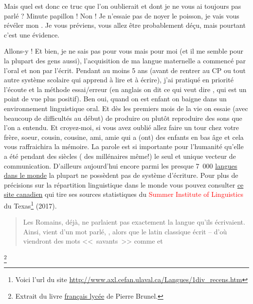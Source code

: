 Mais quel est donc ce truc  que l'on oublierait et dont je
ne vous ai toujours pas parlé ? Minute papillon ! Non ! Je n'essaie
pas de noyer le poisson, je vais vous révéler mon . Je vous
préviens, vous allez être probablement déçu, mais pourtant c'est une
évidence. \par
Allons-y ! Et bien, je ne sais pas pour vous mais pour moi (et il me
semble pour la plupart des gens aussi), l'acquisition de ma langue
maternelle a commencé par l'oral et non par l'écrit. Pendant au moins
5 ans (avant de rentrer au CP ou tout autre système scolaire qui
apprend à lire et à écrire), j'ai pratiqué en priorité l'écoute et la
méthode essai/erreur (en anglais on dit  ce qui veut
dire , qui est un point de vue plus positif). Ben
oui, quand on est enfant on baigne dans un environnement linguistique
oral. Et dès les premiers mois de la vie on essaie (avec beaucoup de
difficultés au début) de produire ou plutôt reproduire des sons que
l'on a entendu. Et croyez-moi, si vous avez oublié allez faire un tour
chez votre frère, soeur, cousin, cousine, ami, amie qui a (ont) des
enfants en bas âge et cela vous raffraichira la mémoire. La parole est
si importante pour l'humanité qu'elle a été pendant des siècles ( des
millénaires même!) le seul et unique vecteur de
communication. D'ailleurs aujourd'hui encore parmi les presque 7~000
\href{http://www.museedelhomme.fr/fr/combien-langues-sont-parlees-monde}{langues dans le monde} la plupart ne possèdent pas de système
d'écriture. Pour plus de précisions sur la répartition linguistique
dans le monde vous pouvez consulter \href{http://www.axl.cefan.ulaval.ca/Langues/1div\_recens.htm}{ce site canadien} qui tire ses
sources statistiques du \textcolor{red}{Summer Institute of Linguistics} du
Texas\footnote{Voici l'url du site
  \url{http://www.axl.cefan.ulaval.ca/Langues/1div_recens.htm}}
(2017).\par


\begin{quote}
Les Romains, déjà, ne parlaient pas exactement la langue qu'ils
écrivaient. Ainsi,  vient d'un mot parlé, , alors
que le latin classique écrit  -- d'où viendront des mots <<~savants~>> comme  et 
\end{quote}\footnote{Extrait du livre \href{https://www.amazon.fr/gp/product/2844100015/ref=as\_li\_tl?ie=UTF8\&camp=1642\&creative=6746\&creativeASIN=2844100015\&linkCode=as2\&tag=wwwbecomefree-21\&linkId=985f3a849fd44728e8480993cf2d5490}{français lycée} de Pierre Brunel.}

